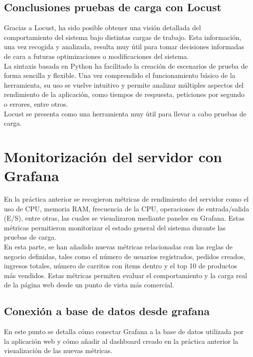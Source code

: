 \documentclass[10pt]{book}
\begin{document}
\newpage
\section{Conclusiones pruebas de carga con Locust}
Gracias a Locust, ha sido posible obtener una visión detallada del comportamiento del sistema bajo distintas cargas de trabajo. Esta información, una vez recogida y analizada, resulta muy útil para tomar decisiones informadas de cara a futuras optimizaciones o modificaciones del sistema.\\

La sintaxis basada en Python ha facilitado la creación de escenarios de prueba de forma sencilla y flexible. Una vez comprendido el funcionamiento básico de la herramienta, su uso se vuelve intuitivo y permite analizar múltiples aspectos del rendimiento de la aplicación, como tiempos de respuesta, peticiones por segundo o errores, entre otros.\\

Locust se presenta como una herramienta muy útil para llevar a cabo pruebas de carga.\\


\chapter{Monitorización del servidor con Grafana}
En la práctica anterior se recogieron métricas de rendimiento del servidor como el uso de CPU, memoria RAM, frecuencia de la CPU, operaciones de entrada/salida (E/S), entre otras, las cuales se visualizaron mediante paneles en Grafana. Estas métricas permitieron monitorizar el estado general del sistema durante las pruebas de carga.\\

En esta parte, se han añadido nuevas métricas relacionadas con las reglas de negocio definidas, tales como el número de usuarios registrados, pedidos creados, ingresos totales, número de carritos con ítems dentro y el top 10 de productos más vendidos. Estas métricas permiten evaluar el comportamiento y la carga real de la página web desde un punto de vista más comercial.

\section{Conexión a base de datos desde grafana}
En este punto se detalla cómo conectar Grafana a la base de datos utilizada por la aplicación web y cómo añadir al dashboard creado en la práctica anterior la visualización de las nuevas métricas.
\end{document}
